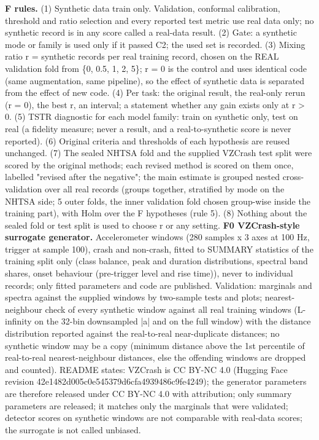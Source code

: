 \textbf{F rules.} (1) Synthetic data train only. Validation, conformal calibration, threshold and ratio selection and every reported test metric use real data only; no synthetic record is in any score called a real-data result. (2) Gate: a synthetic mode or family is used only if it passed C2; the used set is recorded. (3) Mixing ratio r = synthetic records per real training record, chosen on the REAL validation fold from \{0, 0.5, 1, 2, 5\}; r = 0 is the control and uses identical code (same augmentation, same pipeline), so the effect of synthetic data is separated from the effect of new code. (4) Per task: the original result, the real-only rerun (r = 0), the best r, an interval; a statement whether any gain exists only at r > 0. (5) TSTR diagnostic for each model family: train on synthetic only, test on real (a fidelity measure; never a result, and a real-to-synthetic score is never reported). (6) Original criteria and thresholds of each hypothesis are reused unchanged. (7) The sealed NHTSA fold and the supplied VZCrash test split were scored by the original methods; each revised method is scored on them once, labelled "revised after the negative"; the main estimate is grouped nested cross-validation over all real records (groups together, stratified by mode on the NHTSA side; 5 outer folds, the inner validation fold chosen group-wise inside the training part), with Holm over the F hypotheses (rule 5). (8) Nothing about the sealed fold or test split is used to choose r or any setting.
\textbf{F0 VZCrash-style surrogate generator.} Accelerometer windows (280 samples x 3 axes at 100 Hz, trigger at sample 100), crash and non-crash, fitted to SUMMARY statistics of the training split only (class balance, peak and duration distributions, spectral band shares, onset behaviour (pre-trigger level and rise time)), never to individual records; only fitted parameters and code are published. Validation: marginals and spectra against the supplied windows by two-sample tests and plots; nearest-neighbour check of every synthetic window against all real training windows (L-infinity on the 32-bin downsampled |a| and on the full window) with the distance distribution reported against the real-to-real near-duplicate distances; no synthetic window may be a copy (minimum distance above the 1st percentile of real-to-real nearest-neighbour distances, else the offending windows are dropped and counted). README states: VZCrash is CC BY-NC 4.0 (Hugging Face revision 42e1482d005c0e545379d6cfa4939486c9fe4249); the generator parameters are therefore released under CC BY-NC 4.0 with attribution; only summary parameters are released; it matches only the marginals that were validated; detector scores on synthetic windows are not comparable with real-data scores; the surrogate is not called unbiased.
